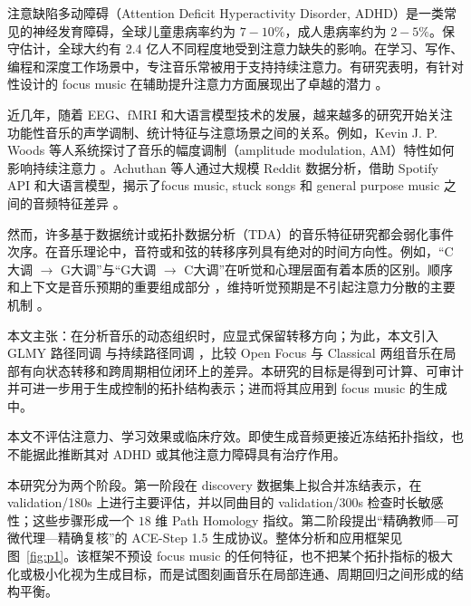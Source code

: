 \documentclass{article}
\begin{document}

注意缺陷多动障碍（Attention Deficit Hyperactivity Disorder, ADHD）是一类常见的神经发育障碍，全球儿童患病率约为 $7-10\%$，成人患病率约为 $2-5\%$\cite{Siva2025}。保守估计，全球大约有 2.4 亿人不同程度地受到注意力缺失的影响。在学习、写作、编程和深度工作场景中，专注音乐常被用于支持持续注意力。有研究表明，有针对性设计的 focus music 在辅助提升注意力方面展现出了卓越的潜力 \cite{MADJAR2020113207, Phoebe2025, Erarslan2026}。

近几年，随着 EEG、fMRI 和大语言模型技术的发展，越来越多的研究开始关注功能性音乐的声学调制、统计特征与注意场景之间的关系。例如，Kevin J. P. Woods 等人系统探讨了音乐的幅度调制（amplitude modulation, AM）特性如何影响持续注意力 \cite{Woods2024}。Achuthan 等人通过大规模 Reddit 数据分析，借助 Spotify API 和大语言模型，揭示了focus music, stuck songs 和 general purpose music 之间的音频特征差异 \cite{Achuthan2025}。

然而，许多基于数据统计或拓扑数据分析（TDA）的音乐特征研究都会弱化事件次序。在音乐理论中，音符或和弦的转移序列具有绝对的时间方向性。例如，``C大调 $\to$ G大调''与``G大调 $\to$ C大调''在听觉和心理层面有着本质的区别。顺序和上下文是音乐预期的重要组成部分 \cite{Stefan2000, David2001}，维持听觉预期是不引起注意力分散的主要机制 \cite{Fiedlere2066232025}。 

本文主张：在分析音乐的动态组织时，应显式保留转移方向；为此，本文引入 GLMY 路径同调 \cite{glmy2013,glmy2020} 与持续路径同调 \cite{Samir2017}，比较 Open Focus 与 Classical 两组音乐在局部有向状态转移和跨周期相位闭环上的差异。本研究的目标是得到可计算、可审计并可进一步用于生成控制的拓扑结构表示；进而将其应用到 focus music 的生成中。

\begin{tcolorbox}[colback=pink!15,colframe=pink!50,boxrule=0.5pt,arc=6pt,left=6pt,right=6pt,top=4pt,bottom=4pt]
本文不评估注意力、学习效果或临床疗效。即使生成音频更接近冻结拓扑指纹，也不能据此推断其对 ADHD 或其他注意力障碍具有治疗作用。
\end{tcolorbox}

本研究分为两个阶段。第一阶段在 discovery 数据集上拟合并冻结表示，在 validation/180s 上进行主要评估，并以同曲目的 validation/300s 检查时长敏感性；这些步骤形成一个 $18$ 维 Path Homology 指纹。第二阶段提出``精确教师---可微代理---精确复核''的 ACE-Step 1.5 \cite{gong2026} 生成协议。整体分析和应用框架见图~\ref{fig:p1}。该框架不预设 focus music 的任何特征，也不把某个拓扑指标的极大化或极小化视为生成目标，而是试图刻画音乐在局部连通、周期回归之间形成的结构平衡。
\end{document}
